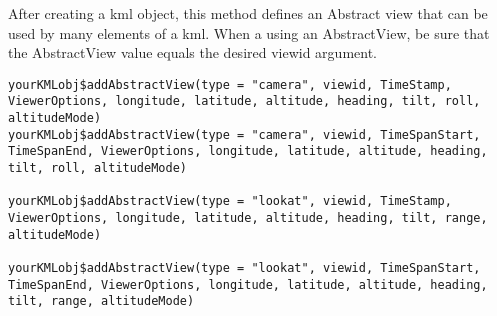 \documentclass[a4paper]{book}
\begin{document}
%
\begin{Description}\relax
After creating a kml object, this method defines an Abstract view that can be used by many elements of a kml. When a using an AbstractView, be sure that the AbstractView value equals the desired viewid argument.
\end{Description}
%
\begin{Usage}
\begin{verbatim}
yourKMLobj$addAbstractView(type = "camera", viewid, TimeStamp, ViewerOptions, longitude, latitude, altitude, heading, tilt, roll, altitudeMode) 
yourKMLobj$addAbstractView(type = "camera", viewid, TimeSpanStart, TimeSpanEnd, ViewerOptions, longitude, latitude, altitude, heading, tilt, roll, altitudeMode)

yourKMLobj$addAbstractView(type = "lookat", viewid, TimeStamp, ViewerOptions, longitude, latitude, altitude, heading, tilt, range, altitudeMode) 

yourKMLobj$addAbstractView(type = "lookat", viewid, TimeSpanStart, TimeSpanEnd, ViewerOptions, longitude, latitude, altitude, heading, tilt, range, altitudeMode) 
\end{verbatim}
\end{Usage}
%
\end{document}
